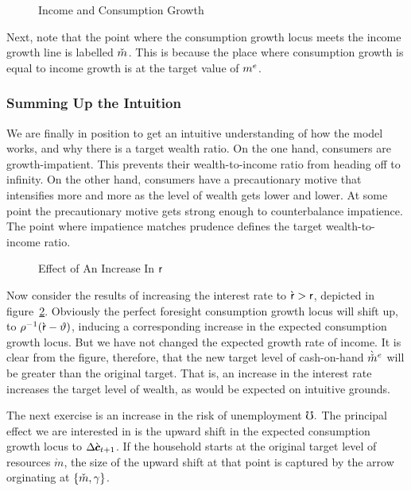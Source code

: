 \message{ !name(TractableBufferStock.tex)}\documentclass{handout}
\begin{document}
\begin{figure}
\caption{Income and Consumption Growth}\label{fig:GrowthA}
\end{figure}

Next, note that the point where the consumption growth locus
meets the income growth line is labelled $\mTarg^{\null}$.  This is
because the place where consumption growth is equal to income
growth is at the target value of $m^{e}$.



\subsubsection{Summing Up the Intuition}
We are finally in position to get an intuitive understanding of how the
model works, and why there is a target wealth ratio.  On the one hand,
consumers are growth-impatient.  This prevents their wealth-to-income ratio
from heading off to infinity.  On the other hand, consumers have
a precautionary motive that intensifies more and more as the level of
wealth gets lower and lower.  At some point the precautionary motive
gets strong enough to counterbalance impatience.  The point where impatience matches prudence defines the
target wealth-to-income ratio.


\begin{figure}
\caption{Effect of An Increase In $\mathsf{r}$}
\label{fig:GrowthB}
\end{figure}

Now consider the results of increasing the interest rate to
$\grave{\mathsf{r}}>\mathsf{r}$, depicted in figure~\ref{fig:GrowthB}.  Obviously the perfect foresight consumption
growth locus will shift up, to $\rho^{-1}(\grave{\mathsf{r}}-\vartheta)$,
inducing a corresponding increase in the expected consumption growth
locus.  But we have not changed the expected growth rate of income.
It is clear from the figure, therefore, that the new target level of
cash-on-hand $\grave{\check{m}}^{e}$ will be greater than the original target.
That is, an increase in the interest rate increases the target level
of wealth, as would be expected on intuitive grounds.

The next exercise is an increase in the risk of unemployment $\mho.$
The principal effect we are interested in is the upward shift in the expected
consumption growth locus to $\Delta \grave{\pmb{c}}_{t+1}$.  If the
household starts at the original target level of resources
$\grave{m}$, the size of the upward shift at that point is captured by the
arrow orginating at $\{\check{m},\gamma\}$.  
\end{document}
